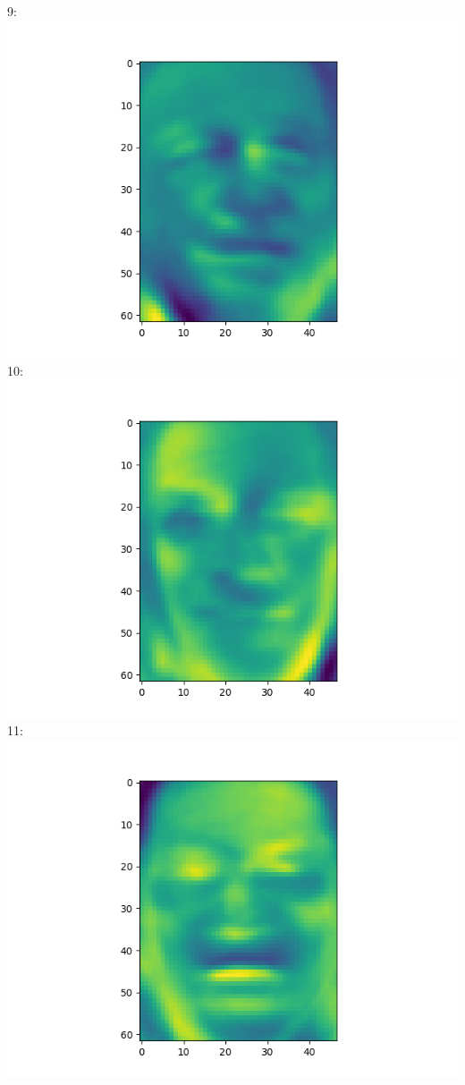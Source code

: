 \documentclass[twoside,10pt]{article}
\theoremstyle{definition}
\theoremstyle{definition}
\theoremstyle{remark}
\renewcommand{\>}{{\rightarrow}}
\newcommand{\1}{{\mathbf 1}}
\newcommand{\0}{{\mathbf 0}}
\begin{document}
\begin{enumerate}
  9:
  \includegraphics[width=\textwidth]{eigenface_9.png}
  10:
  \includegraphics[width=\textwidth]{eigenface_10.png}
  11:
  \includegraphics[width=\textwidth]{eigenface_11.png}

\end{enumerate}
\end{document}
